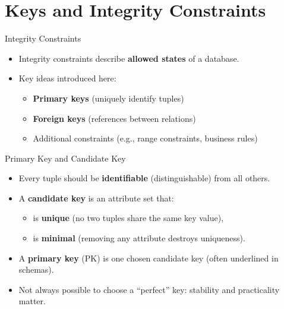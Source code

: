 \documentclass[10pt,aspectratio=169]{beamer}
\begin{document}
\section{Keys and Integrity Constraints}

\begin{frame}{Integrity Constraints}
\small
\begin{itemize}
  \item Integrity constraints describe \textbf{allowed states} of a database.
  \item Key ideas introduced here:
  \begin{itemize}
    \item \textbf{Primary keys} (uniquely identify tuples)
    \item \textbf{Foreign keys} (references between relations)
    \item Additional constraints (e.g., range constraints, business rules)
  \end{itemize}
\end{itemize}
\end{frame}

\begin{frame}{Primary Key and Candidate Key}
\small
\begin{itemize}
  \item Every tuple should be \textbf{identifiable} (distinguishable) from all others.
  \item A \textbf{candidate key} is an attribute set that:
  \begin{itemize}
    \item is \textbf{unique} (no two tuples share the same key value),
    \item is \textbf{minimal} (removing any attribute destroys uniqueness).
  \end{itemize}
  \item A \textbf{primary key} (PK) is one chosen candidate key (often underlined in schemas).
  \item Not always possible to choose a ``perfect'' key: stability and practicality matter.
\end{itemize}
\end{frame}
\end{document}
